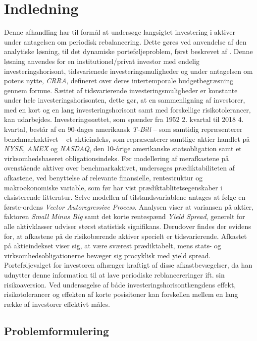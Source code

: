 \documentclass[
  a4paper,
  oneside]{memoir}
\begin{document}
\hypertarget{indledning}{%
\chapter{Indledning}\label{indledning}}

Denne afhandling har til formål at undersøge langsigtet investering i aktiver under antagelsen om periodisk rebalancering. Dette gøres ved anvendelse af den analytiske løsning, til det dynamiske porteføljeproblem, først beskrevet af \citep{JurVic2011}. Denne løsning anvendes for en institutionel/privat investor med endelig investeringshorisont, tidsvarienede investeringsmuligheder og under antagelsen om potens nytte, \emph{CRRA}, defineret over deres intertemporale budgetbegræsning gennem formue. Sættet af tidsvarierende investeringsmuligheder er konstante under hele investeringshorisonten, dette gør, at en sammenligning af investorer, med en kort og en lang investeringshorisont samt med forskellige risikotolerancer, kan udarbejdes. Investeringssættet, som spænder fra 1952 2. kvartal til 2018 4. kvartal, består af en 90-dages amerikansk \emph{T-Bill} -- som samtidig repræsenterer benchmarkaktivet -- et aktieindeks, som repræsenterer samtlige aktier handlet på \emph{NYSE}, \emph{AMEX} og \emph{NASDAQ}, den 10-årige amerikanske statsobligation samt et virksomhedsbaseret obligationsindeks. Før modellering af merafkastene på ovenstående aktiver over benchmarkaktivet, undersøges prædiktabiliteten af afkastene, ved benyttelse af relevante finansielle, rentestruktur og makroøkonomiske variable, som før har vist prædiktablitetsegenskaber i eksisterende litteratur. Selve modellen af tilstandsvariablene antages at følge en første-ordens \emph{Vector Autoregressive Process}. Analysen viser at variansen på aktier, faktoren \emph{Small Minus Big} samt det korte rentespænd \emph{Yield Spread}, generelt for alle aktivklasser udviser størst statistisk signifikans. Derudover findes der evidens for, at afkastene på de risikobærende aktiver specielt er tidsvarierende. Afkastet på aktieindekset viser sig, at være sværest prædiktabelt, mens stats- og virksomhedsobligationerne bevæger sig procyklisk med yield spread. Porteføljevalget for investoren afhænger kraftigt af disse afkastbevægelser, da han udnytter denne information til at lave periodiske reblancereringer ift. sin risikoaversion. Ved undersøgelse af både investeringshorisontlængdens effekt, risikotolerancer og effekten af korte posisitoner kan forskellen mellem en lang række af investorer effektivt måles.

\hypertarget{problemformulering}{%
\section{Problemformulering}\label{problemformulering}}
\end{document}
